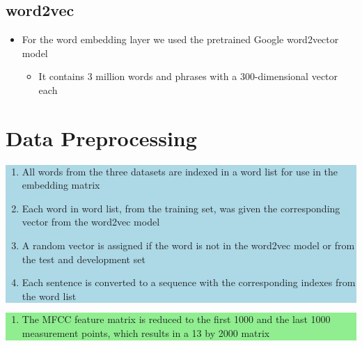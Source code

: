 \documentclass[a0,landscape]{a0poster}
\begin{document}
\begin{multicols}{3}
\subsection*{word2vec}
\begin{itemize}
	\item For the word embedding layer we used the pretrained Google word2vector model
	\begin{itemize}
		\item It contains 3 million words and phrases with a 300-dimensional vector each
	\end{itemize}
\end{itemize}



\section*{Data Preprocessing}
%

\colorbox{lightblue}{
	\parbox{1000pt}{
		\begin{enumerate}
			\item All words from the three datasets are indexed in a word list for use in the embedding matrix
			\item Each word in word list, from the training set, was given the corresponding vector from the word2vec model
			\item A random vector is assigned if the word is not in the word2vec model or from the test and development set
			\item Each sentence is converted to a sequence with the corresponding indexes from the word list
		\end{enumerate}
}}
\colorbox{lightgreen}{
	\parbox{1000pt}{
		\begin{enumerate}
			\item The MFCC feature matrix is reduced to the first 1000 and the last 1000 measurement points, which results in a 13 by 2000 matrix  
		\end{enumerate}
	}}


\end{multicols}
\end{document}
